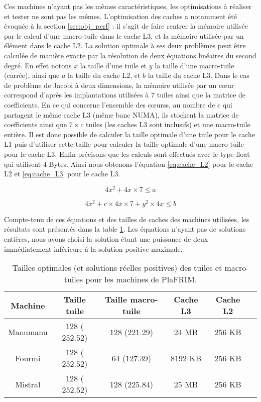 Ces machines n'ayant pas les mêmes caractéristiques, les optimisations à réaliser et tester ne sont pas les mêmes. L'optimisation des caches a notamment été évoquée à la section \ref{sec:obj_perf} : il s'agit de faire rentrer la mémoire utilisée par le calcul d'une macro-tuile dans le cache L3, et la mémoire utilisée par un élément dans le cache L2. La solution optimale à ses deux problèmes peut être calculée de manière exacte par la résolution de deux équations linéaires du second degré. En effet notons $x$ la taille d'une tuile et $y$ la taille d'une macro-tuile (carrée), ainsi que $a$ la taille du cache L2, et $b$ la taille du cache L3. Dans le cas de problème de Jacobi à deux dimensions, la mémoire utilisée par un cœur correspond d'après les implantations utilisées à $7$ tuiles ainsi que la matrice de coefficients. En ce qui concerne l'ensemble des cœurss, au nombre de $c$ qui partagent le même cache L3 (même banc NUMA), ils stockent la matrice de coefficients ainsi que $7 \times c$ tuiles (les caches L3 sont inclusifs) et une macro-tuile entière. Il est donc possible de calculer la taille optimale d'une tuile pour le cache L1 puis d'utiliser cette taille pour calculer la taille optimale d'une macro-tuile pour le cache L3. Enfin précisons que les calculs sont effectués avec le type \textsf{float} qui utilisent $4$ Bytes. Ainsi nous obtenons l'équation \ref{eq:cache_L2} pour le cache L2 et \ref{eq:cache_L3} pour le cache L3.

\begin{equation}
\label{eq:cache_L2}
4x^2 + 4x \times 7 \leq a
\end{equation}

\begin{equation}
\label{eq:cache_L3}
4x^2 + c \times 4x \times 7 + y^2 \times 4x \leq b
\end{equation}

Compte-tenu de ces équations et des tailles de caches des machines utilisées, les résultats sont présentés dans la table \ref{tab:size_cach}. Les équations n'ayant pas de solutions entières, nous avons choisi la solution étant une puissance de deux immédiatement inférieure à la solution positive maximale.

\begin{table}
{
\caption{Tailles optimales (et solutions réelles positives) des tuiles et macro-tuiles pour les machines de \textsf{PlaFRIM}.}
\label{tab:size_cach}
}
{
\begin{tabular}{||c||c|c|c|c|c||}
\hline
Machine & Taille tuile & Taille macro-tuile & Cache L3 & Cache L2 \\
\hline
\hline
Manumanu & $128$ ($252.52$) & $128$ ($221.29$) & $24$ MB & $256$ KB \\
Fourmi & $128$ ($252.52$) & $64$ ($127.39$) & $8192$ KB & $256$ KB \\
Mistral & $128$ ($252.52$) & $128$ ($225.84$) & $25$ MB & $256$ KB \\
\hline
\end{tabular}
}
\end{table} 


